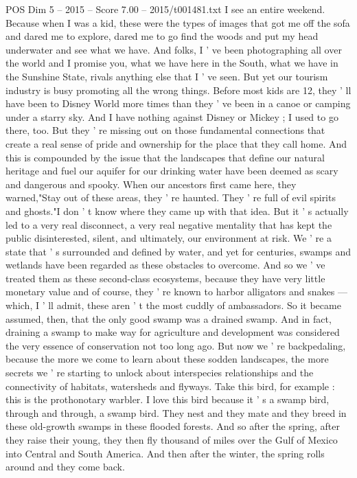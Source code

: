 \begin{textsample}{POS Dim 5 – 2015 – Score 7.00 – 2015/t001481.txt}
I see an entire weekend.
Because when I was a kid, these were the types of images that got me off the sofa and dared me to explore, dared me to go find the woods and put my head underwater and see what we have.
And folks, I ' ve been photographing all over the world and I promise you, what we have here in the South, what we have in the Sunshine State, rivals anything else that I ' ve seen.
But yet our tourism industry is busy promoting all the wrong things.
Before most kids are 12, they ' ll have been to Disney World more times than they ' ve been in a canoe or camping under a starry sky.
And I have nothing against Disney or Mickey ; I used to go there, too.
But they ' re missing out on those fundamental connections that create a real sense of pride and ownership for the place that they call home.
And this is compounded by the issue that the landscapes that define our natural heritage and fuel our aquifer for our drinking water have been deemed as scary and dangerous and spooky.
When our ancestors first came here, they warned,"Stay out of these areas, they ' re haunted.
They ' re full of evil spirits and ghosts."I don ' t know where they came up with that idea.
But it ' s actually led to a very real disconnect, a very real negative mentality that has kept the public disinterested, silent, and ultimately, our environment at risk.
We ' re a state that ' s surrounded and defined by water, and yet for centuries, swamps and wetlands have been regarded as these obstacles to overcome.
And so we ' ve treated them as these second-class ecosystems, because they have very little monetary value and of course, they ' re known to harbor alligators and snakes — which, I ' ll admit, these aren ' t the most cuddly of ambassadors.
So it became assumed, then, that the only good swamp was a drained swamp.
And in fact, draining a swamp to make way for agriculture and development was considered the very essence of conservation not too long ago.
But now we ' re backpedaling, because the more we come to learn about these sodden landscapes, the more secrets we ' re starting to unlock about interspecies relationships and the connectivity of habitats, watersheds and flyways.
Take this bird, for example : this is the prothonotary warbler.
I love this bird because it ' s a swamp bird, through and through, a swamp bird.
They nest and they mate and they breed in these old-growth swamps in these flooded forests.
And so after the spring, after they raise their young, they then fly thousand of miles over the Gulf of Mexico into Central and South America.
And then after the winter, the spring rolls around and they come back.

\end{textsample}
